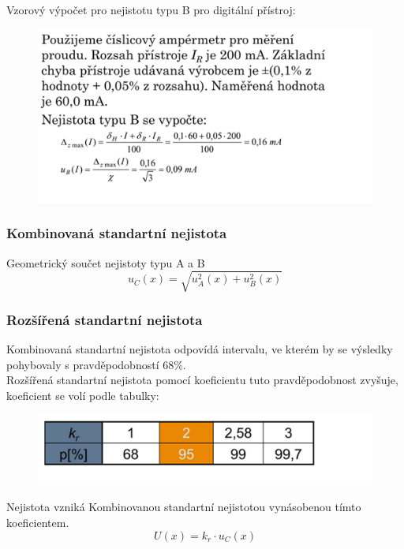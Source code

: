Vzorový výpočet pro nejistotu typu B pro digitální přístroj:
\begin{figure}[H]
    \centering
    \includegraphics[scale = 1]{images/nejistotaB_digital.png}
\end{figure}

\subsubsection*{Kombinovaná standartní nejistota}
Geometrický součet nejistoty typu A a B 
\begin{equation}
    u_C(x) = \sqrt{u_A^2(x)+u_B^2(x)}
\end{equation}
\newpage

\subsubsection*{Rozšířená standartní nejistota}
Kombinovaná standartní nejistota odpovídá intervalu, ve kterém by se výsledky pohybovaly s pravděpodobností 68\%.\\
Rozšířená standartní nejistota pomocí koeficientu tuto pravděpodobnost zvyšuje, koeficient se volí podle tabulky:
\begin{figure}[H]
    \centering
    \includegraphics[scale = 1]{images/nejistota_roz.png}
\end{figure}
Nejistota vzniká Kombinovanou standartní nejistotou vynásobenou tímto koeficientem.
\begin{equation}
    U(x) = k_r\cdot u_C(x)
\end{equation}

